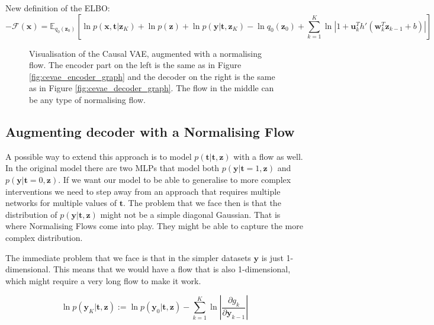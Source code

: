 \documentclass{report}
\newcommand{\bt}{\mathbf{t}}
\newcommand{\bu}{\mathbf{u}}
\newcommand{\bw}{\mathbf{w}}
\newcommand{\bx}{\mathbf{x}}
\newcommand{\by}{\mathbf{y}}
\newcommand{\bz}{\mathbf{z}}
\newcommand{\parfrac}[2]{\frac{\partial #1}{\partial#2}}
\begin{document}
\noindent
New definition of the ELBO:
\begin{equation}
    -\mathcal{F}(\bx) = \mathbb{E}_{q_0(\bz_0)}\left[\ln p(\bx, \bt | \bz_K) + \ln p(\bz) + \ln p(\by |\bt, \bz_K) - \ln q_0(\bz_0) + \sum\limits^K_{k=1} \ln \left| 1 + \bu_k^Th'(\bw^T_k\bz_{k-1} + b)\right| \right]
\end{equation}


\begin{figure}
    \centering
    
    \caption{Visualisation of the Causal VAE, augmented with a normalising flow. The encoder part on the left is the same as in Figure \ref{fig:cevae_encoder_graph} and the decoder on the right is the same as in Figure \ref{fig:cevae_decoder_graph}. The flow in the middle can be any type of normalising flow.}
    \label{fig:cenf_with_vae}
\end{figure}

\subsection{Augmenting decoder with a Normalising Flow}
A possible way to extend this approach is to model $p(\bt|\bt,\bz)$ with a flow as well. In the original model there are two MLPs that model both $p(\by|\bt=1,\bz)$ and $p(\by|\bt=0,\bz)$. If we want our model to be able to generalise to more complex interventions we need to step away from an approach that requires multiple networks for multiple values of $\bt$. The problem that we face then is that the distribution of $p(\by|\bt,\bz)$ might not be a simple diagonal Gaussian. That is where Normalising Flows come into play. They might be able to capture the more complex distribution. 

The immediate problem that we face is that in the simpler datasets $\by$ is just 1-dimensional. This means that we would have a flow that is also 1-dimensional, which might require a very long flow to make it work.

\begin{equation}
    \ln p(\by_K|\bt, \bz) := \ln p(\by_0|\bt, \bz) - \sum\limits^K_{k=1} \ln \left | \parfrac{g_k}{\by_{k-1}} \right|
\end{equation}
\end{document}
